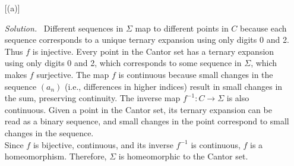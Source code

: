 \documentclass[12pt]{article}
\renewcommand{\_}[1]{\underline{ #1 }}
\theoremstyle{definition}
\newenvironment{exercise}[1]
  {\renewcommand\theinnercustomthm{#1}\innercustomthm}
  {\endinnercustomthm}
\newenvironment{solution}{\par\noindent\textit{Solution.}\ }{\par}
\numberwithin{equation}{subsection}
\begin{document}
\begin{exercise}{101}
\begin{enumerate} [(a)]
\begin{solution}
Different sequences in \(\Sigma\) map to different points in \(C\) because each sequence corresponds to a unique ternary expansion using only digits 0 and 2. Thus $f$ is injective. Every point in the Cantor set has a ternary expansion using only digits 0 and 2, which corresponds to some sequence in \(\Sigma\), which makes $f$ surjective. The map \(f\) is continuous because small changes in the sequence \((a_n)\) (i.e., differences in higher indices) result in small changes in the sum, preserving continuity. The inverse map \(f^{-1}: C \to \Sigma\) is also continuous. Given a point in the Cantor set, its ternary expansion can be read as a binary sequence, and small changes in the point correspond to small changes in the sequence. \\
Since \(f\) is bijective, continuous, and its inverse \(f^{-1}\) is continuous, \(f\) is a homeomorphism. Therefore, \(\Sigma\) is homeomorphic to the Cantor set.
\end{solution}
    \end{enumerate}
\end{exercise}
\end{document}
